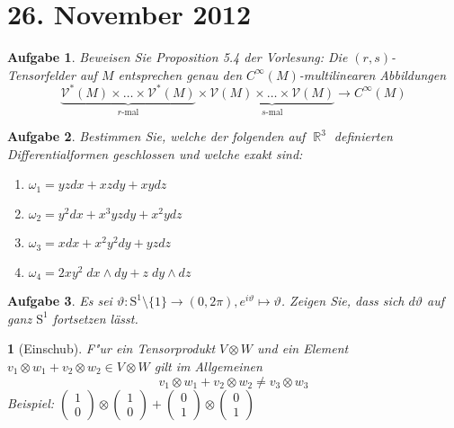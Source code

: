 \documentclass[paper=A4, twoside, chapterprefix=true, bibliography=totoc, headsepline]{scrbook}
\let\temp\phi{}
\let\phi\varphi{}
\let\varphi\temp{}
\let\temp\theta{}
\let\theta\vartheta{}
\let\vartheta\temp{}
\let\temp\epsilon{}
\let\epsilon\varepsilon{}
\let\varepsilon\temp{}
\let\temp\rho{}
\let\rho\varrho{}
\let\varrho\temp{}
\DeclareMathOperator{\R}{\mathbb{R}}
\theoremstyle{plain}
\theoremstyle{nonumberplain}
\theoremstyle{empty}
\newtheorem{emptythm}{}%
\theoremstyle{break}
\newtheorem{Aufg}{Aufgabe}
\begin{document}

\section{26. November 2012}
\setcounter{Aufg}{0} %
\setcounter{Loes}{0}

\begin{Aufg}
Beweisen Sie Proposition 5.4 der Vorlesung: Die $(r,s)$-Tensorfelder auf $M$ entsprechen genau den $C^\infty(M)$-multilinearen Abbildungen
	\[\underbrace{\mathcal{V^*}(M) \times \dots \times \mathcal{V^*}(M)}_\text{$r$-mal} \times \underbrace{\mathcal{V}(M)\times \dots \times \mathcal{V}(M)}_\text{$s$-mal} \to C^\infty(M)\]
\end{Aufg}

\begin{Aufg}
Bestimmen Sie, welche der folgenden auf $\R^3$ definierten Differentialformen geschlossen und  welche exakt sind:
\begin{enumerate}[label=\alph*),leftmargin=*,widest=b]
\item
	$\omega_1=y z dx + x z d y + x y dz$
\item
	$\omega_2=y^2 dx + x^3 y z d y + x^2 y dz$
\item
	$\omega_3=x dx + x^2 y^2 d y + y  z dz$
\item
	$\omega_4=2 xy^2 \;dx\wedge dy +  z \;d y\wedge dz$
\end{enumerate}\end{Aufg}

\begin{Aufg}
Es sei $\theta: \mathrm{S}^1\setminus \{1\} \to (0,2\pi), e^{i \theta} \mapsto \theta$. Zeigen Sie, dass sich $d\theta$ auf ganz $\mathrm{S}^1$ fortsetzen lässt.
\end{Aufg}

\begin{emptythm}[Einschub]
F"ur ein Tensorprodukt $V \otimes W$ und ein Element $v_1 \otimes w_1 + v_2 \otimes w_2 \in V \otimes W$ gilt im Allgemeinen
	\[v_1 \otimes w_1 + v_2 \otimes w_2 \ne v_3 \otimes w_3 \]
\emph{Beispiel:} $\left( \begin{smallmatrix} 1 \\ 0 \end{smallmatrix} \right) \otimes \left( \begin{smallmatrix} 1 \\ 0 \end{smallmatrix} \right) + \left( \begin{smallmatrix} 0 \\ 1 \end{smallmatrix} \right) \otimes \left( \begin{smallmatrix} 0 \\ 1 \end{smallmatrix} \right)$
\end{emptythm}
\end{document}
